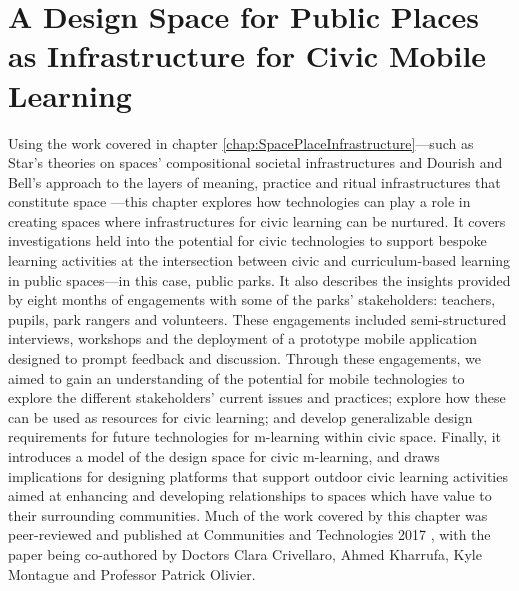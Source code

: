 \chapter{A Design Space for Public Places as Infrastructure for Civic Mobile Learning}
\label{chap:DesignSpace}

Using the work covered in chapter \ref{chap:SpacePlaceInfrastructure}---such as Star’s theories on spaces’ compositional societal infrastructures \citep{Star1999} and Dourish and Bell’s approach to the layers of meaning, practice and ritual infrastructures that constitute space \citep{Dourish2006}---this chapter explores how technologies can play a role in creating spaces where infrastructures for civic learning can be nurtured. It covers investigations held into the potential for civic technologies to support bespoke learning activities at the intersection between civic and curriculum-based learning in public spaces---in this case, public parks. It also describes the insights provided by eight months of engagements with some of the parks' stakeholders: teachers, pupils, park rangers and volunteers. These engagements included semi-structured interviews, workshops and the deployment of a prototype mobile application designed to prompt feedback and discussion. Through these engagements, we aimed to gain an understanding of the potential for mobile technologies to explore the different stakeholders' current issues and practices; explore how these can be used as resources for civic learning; and develop generalizable design requirements for future technologies for m-learning within civic space. Finally, it introduces a model of the design space for civic m-learning, and draws implications for designing platforms that support outdoor civic learning activities aimed at enhancing and developing relationships to spaces which have value to their surrounding communities. Much of the work covered by this chapter was peer-reviewed and published at Communities and Technologies 2017 \citep{Richardson2017}, with the paper being co-authored by Doctors Clara Crivellaro, Ahmed Kharrufa, Kyle Montague and Professor Patrick Olivier. 

